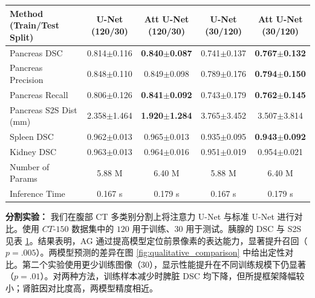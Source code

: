 \documentclass{article}
\begin{document}
\begin{table}[t]\footnotesize
	\parbox{\textwidth}{
		\label{tab:results_attention_1}
		\vspace{2 mm}
		\begin{tabular}{@{\extracolsep{1pt}}lcccc@{}} 
			Method (Train/Test Split) & U-Net (120/30) & Att U-Net (120/30) & U-Net (30/120) & Att U-Net (30/120)\\ \midrule 
			
			Pancreas DSC       &   0.814$\pm$0.116   & \textbf{0.840$\pm$0.087} &  0.741$\pm$0.137 & \textbf{0.767$\pm$0.132} \\
			Pancreas Precision &   0.848$\pm$0.110   & 0.849$\pm$0.098          &  0.789$\pm$0.176 & \textbf{0.794$\pm$0.150} \\
			Pancreas Recall    &   0.806$\pm$0.126   & \textbf{0.841$\pm$0.092} &  0.743$\pm$0.179 & \textbf{0.762$\pm$0.145} \\
			Pancreas S2S Dist (mm) & 2.358$\pm$1.464 & \textbf{1.920$\pm$1.284} &  3.765$\pm$3.452 & 3.507$\pm$3.814 \\ \midrule
			Spleen DSC     &  0.962$\pm$0.013 & 0.965$\pm$0.013 & 0.935$\pm$0.095 & \textbf{0.943$\pm$0.092} \\
			Kidney DSC     &  0.963$\pm$0.013 & 0.964$\pm$0.016 & 0.951$\pm$0.019 & 0.954$\pm$0.021 \\
			Number of Params    &  5.88 M          & 6.40 M          & 5.88 M  & 6.40 M \\
			Inference Time &  0.167 s         & 0.179 s         & 0.167 s & 0.179 s\\ 			\midrule
		\end{tabular}
	}
\end{table}

\textbf{分割实验：} 我们在腹部 CT 多类别分割上将注意力 U-Net 与标准 U-Net 进行对比。使用 $CT$-$150$ 数据集中的 $120$ 用于训练、$30$ 用于测试。胰腺的 DSC 与 S2S 见表 \ref{tab:results_attention_1}。结果表明，AG 通过提高模型定位前景像素的表达能力，显著提升召回（$p = .005$）。两模型预测的差异在图 \ref{fig:qualitative_comparison} 中给出定性对比。第二个实验使用更少训练图像（$30$），显示性能提升在不同训练规模下仍显著（$p = .01$）。对两种方法，训练样本减少时脾脏 DSC 均下降，但所提框架降幅较小；肾脏因对比度高，两模型精度相近。
	
\end{document}
